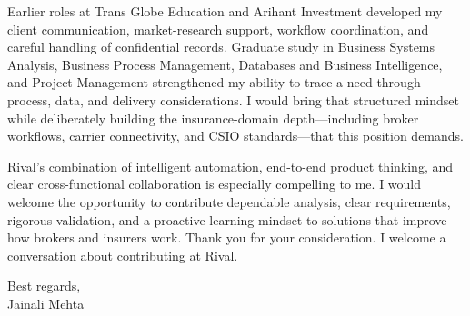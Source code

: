 \documentclass[letterpaper,11pt]{article}
\begin{document}
\bigbreak
Earlier roles at Trans Globe Education and Arihant Investment developed my client communication, market-research support, workflow coordination, and careful handling of confidential records. Graduate study in Business Systems Analysis, Business Process Management, Databases and Business Intelligence, and Project Management strengthened my ability to trace a need through process, data, and delivery considerations. I would bring that structured mindset while deliberately building the insurance-domain depth---including broker workflows, carrier connectivity, and CSIO standards---that this position demands.

\bigbreak
Rival's combination of intelligent automation, end-to-end product thinking, and clear cross-functional collaboration is especially compelling to me. I would welcome the opportunity to contribute dependable analysis, clear requirements, rigorous validation, and a proactive learning mindset to solutions that improve how brokers and insurers work. Thank you for your consideration. I welcome a conversation about contributing at Rival.

\bigbreak
Best regards,\\
Jainali Mehta
\end{document}

